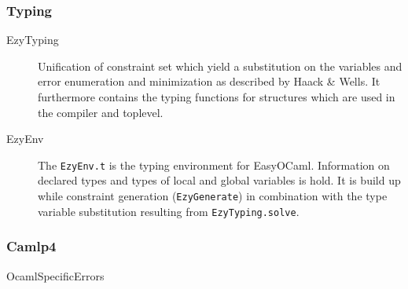 \subsubsection{Typing}

\begin{description}
    \item[EzyTyping] Unification of constraint set which yield a 
        substitution on the variables and error enumeration and 
        minimization as described by Haack \& Wells.  It furthermore 
        contains the typing functions for structures which are used in 
        the compiler and toplevel.
    \item[EzyEnv] The \texttt{EzyEnv.t} is the typing environment 
        for EasyOCaml. Information on declared types and types of local 
        and global variables is hold.  It is build up while constraint 
        generation (\texttt{EzyGenerate}) in combination with the type 
        variable substitution resulting from \texttt{EzyTyping.solve}.
\end{description}


\subsubsection{Camlp4}
\begin{description}
  \item[OcamlSpecificErrors]
    \label{mod:ocamlspecificerrors}
\end{description}
